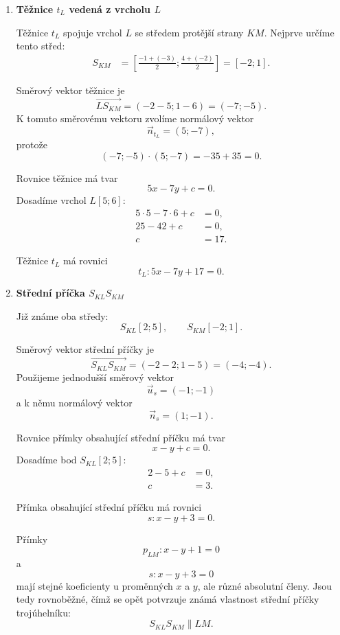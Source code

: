 \begin{example}
\begin{enumerate}[label=\alph*), leftmargin=2em]
        \item \textbf{Těžnice $t_L$ vedená z vrcholu $L$}

        Těžnice $t_L$ spojuje vrchol $L$ se středem protější strany
        $KM$. Nejprve určíme tento střed:
        \begin{align*}
            S_{KM}
            &=
            \left[
                \frac{-1+(-3)}{2};
                \frac{4+(-2)}{2}
            \right] = [-2;1].
        \end{align*}

        Směrový vektor těžnice je
        \[
            \overrightarrow{LS_{KM}}
            =
            (-2-5;1-6)
            =
            (-7;-5).
        \]
        K tomuto směrovému vektoru zvolíme normálový vektor
        \[
            \vec{n}_{t_L}=(5;-7),
        \]
        protože
        \[
            (-7;-5)\cdot(5;-7)=-35+35=0.
        \]

        Rovnice těžnice má tvar
        \[
            5x-7y+c=0.
        \]
        Dosadíme vrchol $L[5;6]$:
        \begin{align*}
            5\cdot5-7\cdot6+c&=0,\\
            25-42+c&=0,\\
            c&=17.
        \end{align*}

        Těžnice $t_L$ má rovnici
        \[
            t_L: 5x-7y+17=0.
        \]

        \item \textbf{Střední příčka $S_{KL}S_{KM}$}

        Již známe oba středy:
        \[
            S_{KL}[2;5],
            \qquad
            S_{KM}[-2;1].
        \]

        Směrový vektor střední příčky je
        \[
            \overrightarrow{S_{KL}S_{KM}}
            =
            (-2-2;1-5)
            =
            (-4;-4).
        \]
        Použijeme jednodušší směrový vektor
        \[
            \vec{u}_s=(-1;-1)
        \]
        a k němu normálový vektor
        \[
            \vec{n}_s=(1;-1).
        \]

        Rovnice přímky obsahující střední příčku má tvar
        \[
            x-y+c=0.
        \]
        Dosadíme bod $S_{KL}[2;5]$:
        \begin{align*}
            2-5+c&=0,\\
            c&=3.
        \end{align*}

        Přímka obsahující střední příčku má rovnici
        \[
            s: x-y+3=0.
        \]

        Přímky
        \[
            p_{LM}:x-y+1=0
        \]
        a
        \[
            s:x-y+3=0
        \]
        mají stejné koeficienty u proměnných $x$ a $y$, ale různé
        absolutní členy. Jsou tedy rovnoběžné, čímž se opět potvrzuje známá
        vlastnost střední příčky trojúhelníku:
        \[
            S_{KL}S_{KM}\parallel LM.
        \]

    \end{enumerate}
\end{example}


